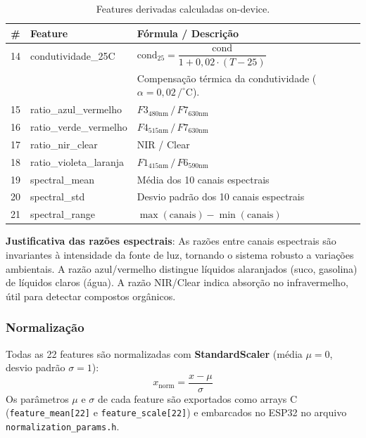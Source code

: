 \documentclass[12pt, a4paper]{article}
\begin{document}
\begin{table}[H]
  \centering
  \caption{Features derivadas calculadas on-device.}
  \begin{tabular}{clp{7cm}}
    \toprule
    \textbf{\#} & \textbf{Feature} & \textbf{F\'{o}rmula / Descri\c{c}\~{a}o} \\
    \midrule
    14 & condutividade\_25C & $\text{cond}_{25} = \dfrac{\text{cond}}{1 + 0{,}02 \cdot (T - 25)}$ \\[6pt]
    & & Compensa\c{c}\~{a}o t\'{e}rmica da condutividade ($\alpha = 0{,}02\,/^\circ$C). \\[4pt]
    15 & ratio\_azul\_vermelho & $F3_{480\text{nm}} \,/\, F7_{630\text{nm}}$ \\
    16 & ratio\_verde\_vermelho & $F4_{515\text{nm}} \,/\, F7_{630\text{nm}}$ \\
    17 & ratio\_nir\_clear & NIR / Clear \\
    18 & ratio\_violeta\_laranja & $F1_{415\text{nm}} \,/\, F6_{590\text{nm}}$ \\
    19 & spectral\_mean & M\'{e}dia dos 10 canais espectrais \\
    20 & spectral\_std & Desvio padr\~{a}o dos 10 canais espectrais \\
    21 & spectral\_range & $\max(\text{canais}) - \min(\text{canais})$ \\
    \bottomrule
  \end{tabular}
\end{table}

\textbf{Justificativa das raz\~{o}es espectrais}: As raz\~{o}es entre canais espectrais s\~{a}o invariantes \`{a} intensidade da fonte de luz, tornando o sistema robusto a varia\c{c}\~{o}es ambientais. A raz\~{a}o azul/vermelho distingue l\'{i}quidos alaranjados (suco, gasolina) de l\'{i}quidos claros (\'{a}gua). A raz\~{a}o NIR/Clear indica absor\c{c}\~{a}o no infravermelho, \'{u}til para detectar compostos org\^{a}nicos.

\subsubsection{Normaliza\c{c}\~{a}o}

Todas as 22 features s\~{a}o normalizadas com \textbf{StandardScaler} (m\'{e}dia $\mu = 0$, desvio padr\~{a}o $\sigma = 1$):
\[
  x_{\text{norm}} = \frac{x - \mu}{\sigma}
\]
Os par\^{a}metros $\mu$ e $\sigma$ de cada feature s\~{a}o exportados como arrays C (\texttt{feature\_mean[22]} e \texttt{feature\_scale[22]}) e embarcados no ESP32 no arquivo \texttt{normalization\_params.h}.
\end{document}
